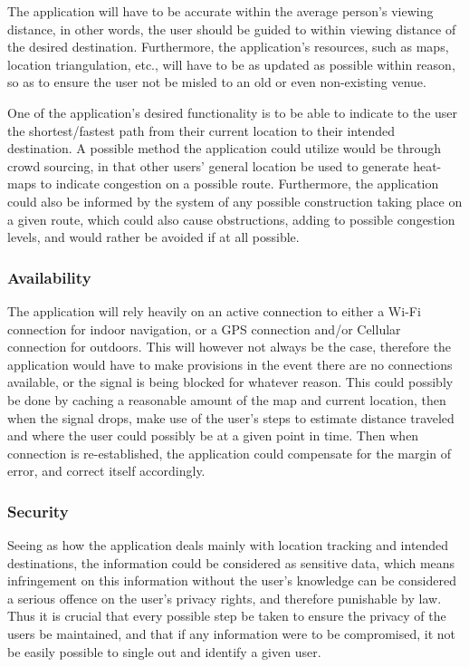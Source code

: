 \documentclass[11pt]{article}
\begin{document}
		The application will have to be accurate within the average person’s viewing distance, in other words, the user should be guided to within viewing distance of the desired destination.  Furthermore, the application’s resources, such as maps, location triangulation, etc., will have to be as updated as possible within reason, so as to ensure the user not be misled to an old or even non-existing venue.  

		

		One of the application’s desired functionality is to be able to indicate to the user the shortest/fastest path from their current location to their intended destination.  A possible method the application could utilize would be through crowd sourcing, in that other users’ general location be used to generate heat-maps to indicate congestion on a possible route.  Furthermore, the application could also be informed by the system of any possible construction taking place on a given route, which could also cause obstructions, adding to possible congestion levels, and would rather be avoided if at all possible.  

		

		\subsubsection{Availability}

		The application will rely heavily on an active connection to either a Wi-Fi connection for indoor navigation, or a GPS connection and/or Cellular connection for outdoors.  This will however not always be the case, therefore the application would have to make provisions in the event there are no connections available, or the signal is being blocked for whatever reason.  This could possibly be done by caching a reasonable amount of the map and current location, then when the signal drops, make use of the user’s steps to estimate distance traveled and where the user could possibly be at a given point in time.  Then when connection is re-established, the application could compensate for the margin of error, and correct itself accordingly.  

		

		\subsubsection{Security}

		Seeing as how the application deals mainly with location tracking and intended destinations, the information could be considered as sensitive data, which means infringement on this information without the user’s knowledge can be considered a serious offence on the user’s privacy rights, and therefore punishable by law.  Thus it is crucial that every possible step be taken to ensure the privacy of the users be maintained, and that if any information were to be compromised, it not be easily possible to single out and identify a given user.  
\end{document}
